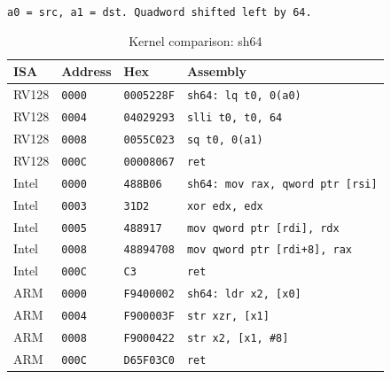 \begin{table}[htbp]
\centering
\caption{Kernel comparison: sh64}
\begingroup
\scriptsize
\setlength{\tabcolsep}{4pt}
\noindent \texttt{a0 = src, a1 = dst. Quadword shifted left by 64.}\par
\vspace{0.6ex}
\begin{tabular}{@{}l|l|l|p{7.2cm}@{}}
\toprule
ISA & Address & Hex & Assembly \\
\midrule
RV128 & \texttt{0000} & \texttt{0005228F} & \texttt{sh64: lq t0, 0(a0)} \\
RV128 & \texttt{0004} & \texttt{04029293} & \texttt{slli t0, t0, 64} \\
RV128 & \texttt{0008} & \texttt{0055C023} & \texttt{sq t0, 0(a1)} \\
RV128 & \texttt{000C} & \texttt{00008067} & \texttt{ret} \\
\midrule
Intel & \texttt{0000} & \texttt{488B06} & \texttt{sh64: mov rax, qword ptr [rsi]} \\
Intel & \texttt{0003} & \texttt{31D2} & \texttt{xor edx, edx} \\
Intel & \texttt{0005} & \texttt{488917} & \texttt{mov qword ptr [rdi], rdx} \\
Intel & \texttt{0008} & \texttt{48894708} & \texttt{mov qword ptr [rdi+8], rax} \\
Intel & \texttt{000C} & \texttt{C3} & \texttt{ret} \\
\midrule
ARM & \texttt{0000} & \texttt{F9400002} & \texttt{sh64: ldr x2, [x0]} \\
ARM & \texttt{0004} & \texttt{F900003F} & \texttt{str xzr, [x1]} \\
ARM & \texttt{0008} & \texttt{F9000422} & \texttt{str x2, [x1, \#8]} \\
ARM & \texttt{000C} & \texttt{D65F03C0} & \texttt{ret} \\
\bottomrule
\end{tabular}
\endgroup
\end{table}
\noindent{}\par

